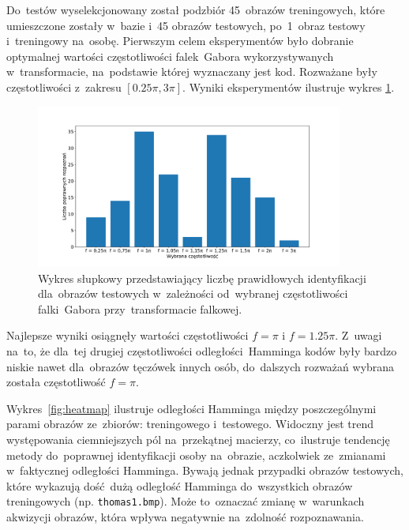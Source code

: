 \documentclass[11pt,a4paper]{article}
\begin{document}
Do~testów wyselekcjonowany został podzbiór 45~obrazów treningowych, które umieszczone zostały w~bazie i~45 obrazów testowych, po~1~obraz testowy i~treningowy na~osobę.
Pierwszym celem eksperymentów było dobranie optymalnej wartości częstotliwości falek~Gabora wykorzystywanych w~transformacie, na~podstawie której wyznaczany jest kod.
Rozważane były częstotliwości z~zakresu $[0.25 \pi, 3 \pi]$.
Wyniki eksperymentów ilustruje wykres \ref{fig:wavelet-frequency}.

\begin{figure}
    \centering
    \includegraphics[width=0.9\textwidth]{res/img/freq.pdf}
    \caption{
        Wykres słupkowy przedstawiający liczbę prawidłowych identyfikacji dla~obrazów testowych w~zależności od~wybranej częstotliwości falki~Gabora przy~transformacie falkowej.
    }
    \label{fig:wavelet-frequency}
\end{figure}

Najlepsze wyniki osiągnęły wartości częstotliwości $f = \pi$ i $f = 1.25 \pi$.
Z~uwagi na~to, że dla~tej drugiej częstotliwości odległości~Hamminga kodów były bardzo niskie nawet dla~obrazów tęczówek innych osób, do~dalszych rozważań wybrana została częstotliwość $f = \pi$.

Wykres~\ref{fig:heatmap} ilustruje odległości Hamminga między poszczególnymi parami obrazów ze~zbiorów: treningowego i~testowego.
Widoczny jest trend występowania ciemniejszych pól na~przekątnej macierzy, co~ilustruje tendencję metody do~poprawnej identyfikacji osoby na~obrazie, aczkolwiek ze~zmianami w~faktycznej odległości Hamminga.
Bywają jednak przypadki obrazów testowych, które wykazują dość~dużą odległość Hamminga do~wszystkich obrazów treningowych (np. \texttt{thomas1.bmp}).
Może to~oznaczać zmianę w~warunkach akwizycji obrazów, która wpływa negatywnie na~zdolność rozpoznawania.
\end{document}
